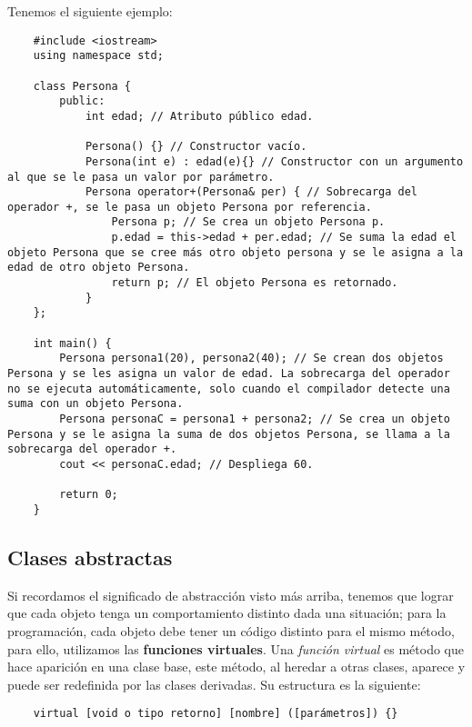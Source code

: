 Tenemos el siguiente ejemplo:
\begin{lstlisting}
    #include <iostream>
    using namespace std;
    
    class Persona {
        public:
            int edad; // Atributo público edad.

            Persona() {} // Constructor vacío.
            Persona(int e) : edad(e){} // Constructor con un argumento al que se le pasa un valor por parámetro.
            Persona operator+(Persona& per) { // Sobrecarga del operador +, se le pasa un objeto Persona por referencia.
                Persona p; // Se crea un objeto Persona p.
                p.edad = this->edad + per.edad; // Se suma la edad el objeto Persona que se cree más otro objeto persona y se le asigna a la edad de otro objeto Persona.
                return p; // El objeto Persona es retornado.
            }
    };

    int main() {
        Persona persona1(20), persona2(40); // Se crean dos objetos Persona y se les asigna un valor de edad. La sobrecarga del operador no se ejecuta automáticamente, solo cuando el compilador detecte una suma con un objeto Persona.
        Persona personaC = persona1 + persona2; // Se crea un objeto Persona y se le asigna la suma de dos objetos Persona, se llama a la sobrecarga del operador +.
        cout << personaC.edad; // Despliega 60.
        
        return 0;
    }
\end{lstlisting}


\subsection{Clases abstractas}

Si recordamos el significado de abstracción visto más arriba, tenemos que lograr que cada objeto tenga un comportamiento distinto dada una situación; para la programación, cada objeto debe tener un código distinto para el mismo método, para ello, utilizamos las \textbf{funciones virtuales}. Una \textit{función virtual} es método que hace aparición en una clase base, este método, al heredar a otras clases, aparece y puede ser redefinida por las clases derivadas. Su estructura es la siguiente:
\begin{lstlisting}
    virtual [void o tipo retorno] [nombre] ([parámetros]) {}
\end{lstlisting}

